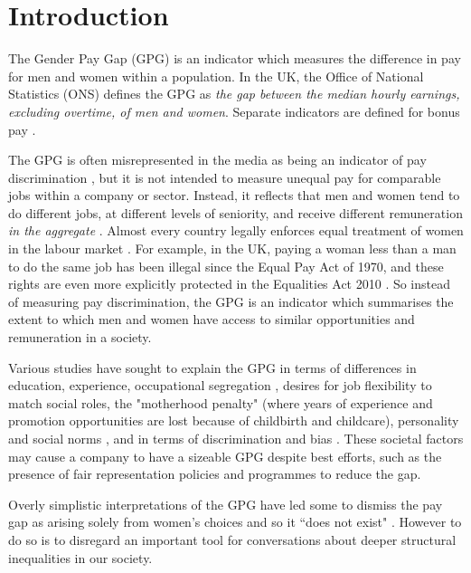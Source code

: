 \section{Introduction}

The Gender Pay Gap (GPG) is an indicator which measures the difference in pay for men and women within a population. In the UK, the Office of National Statistics (ONS) defines the GPG as \textit {the gap between the median hourly earnings, excluding overtime, of men and women}. Separate indicators are defined for bonus pay \cite{ONS2018}.  

The GPG is often misrepresented in the media as being an indicator of pay discrimination \cite{Lukas2011}, but it is not intended to measure unequal pay for comparable jobs within a company or sector. Instead, it reflects that men and women tend to do different jobs, at different levels of seniority, and receive different remuneration \emph{in the aggregate}  \cite{Maschinen}. Almost every country legally enforces equal treatment of women in the labour market \cite{owideconomicinequalitybygender}. For example, in the UK, paying a woman less than a man to do the same job has been illegal since the Equal Pay Act of 1970, and these rights are even more explicitly protected in the Equalities Act 2010 \cite{GOVUK2017}. So instead of measuring pay discrimination, the GPG is an indicator which summarises the extent to which men and women have access to similar opportunities and remuneration in a society. 

Various studies have sought to explain the GPG in terms of differences in education, experience, occupational segregation \cite{brynin2017gender}, desires for job flexibility to match social roles, the "motherhood penalty" (where years of experience and promotion opportunities are lost because of childbirth and childcare), personality and social norms \cite{leibbrandt2014}, and in terms of discrimination and bias \cite{owideconomicinequalitybygender}.  These societal factors may cause a company to have a sizeable GPG despite best efforts, such as the presence of fair representation policies and programmes to reduce the gap. 

Overly simplistic interpretations of the GPG have led some to dismiss the pay gap as arising solely from women's choices and so it ``does not exist" \cite{Lukas2011}. However to do so is to disregard an important tool for conversations about deeper structural inequalities in our society.

